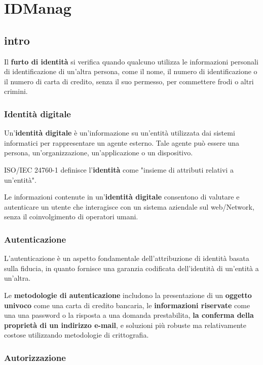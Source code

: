 \chapter{IDManag}

\section{intro}
Il \textbf{furto di identità} si verifica quando qualcuno utilizza le informazioni personali di identificazione di un'altra persona, come il nome, il numero di identificazione o il numero di carta di credito, senza il suo permesso, per commettere frodi o altri crimini.

\subsection{Identità digitale}
Un'\textbf{identità digitale} è un'informazione su un'entità utilizzata dai sistemi informatici per rappresentare un agente esterno. Tale agente può essere una persona, un'organizzazione, un'applicazione o un dispositivo.

ISO/IEC 24760-1 definisce l'\textbf{identità} come "insieme di attributi relativi a un'entità".

Le informazioni contenute in un'\textbf{identità digitale} consentono di valutare e autenticare un utente che interagisce con un sistema aziendale sul web/Network, senza il coinvolgimento di operatori umani.

\subsection{Autenticazione}
L'autenticazione è un aspetto fondamentale dell'attribuzione di identità basata sulla fiducia, in quanto fornisce una garanzia codificata dell'identità di un'entità a un'altra.

Le \textbf{metodologie di autenticazione} includono la presentazione di un \textbf{oggetto univoco} come una carta di credito bancaria, le \textbf{informazioni riservate} come una una password o la risposta a una domanda prestabilita, \textbf{la conferma della proprietà di un indirizzo e-mail}, e soluzioni più robuste ma relativamente costose utilizzando metodologie di crittografia.

\subsection{Autorizzazione}

